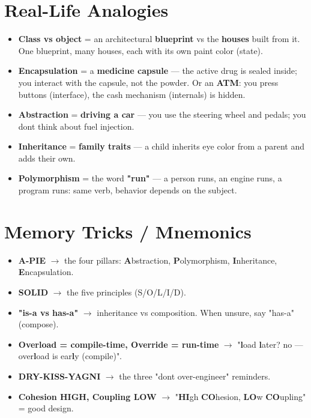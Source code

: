 \documentclass[11pt]{article}
\providecommand{\tightlist}{\setlength{\itemsep}{1pt}\setlength{\parskip}{0pt}}
\begin{document}
\section{Real-Life Analogies}\label{real-life-analogies}

\begin{itemize}
\tightlist
\item
  \textbf{Class vs object} = an architectural \textbf{blueprint} vs the \textbf{houses} built from it. One blueprint, many houses, each with its own paint color (state).
\item
  \textbf{Encapsulation} = a \textbf{medicine capsule} --- the active drug is sealed inside; you interact with the capsule, not the powder. Or an \textbf{ATM}: you press buttons (interface), the cash mechanism (internals) is hidden.
\item
  \textbf{Abstraction} = \textbf{driving a car} --- you use the steering wheel and pedals; you don\textquotesingle t think about fuel injection.
\item
  \textbf{Inheritance} = \textbf{family traits} --- a child inherits eye color from a parent and adds their own.
\item
  \textbf{Polymorphism} = the word \textbf{"run"} --- a person runs, an engine runs, a program runs: same verb, behavior depends on the subject.
\end{itemize}

\section{Memory Tricks / Mnemonics}\label{memory-tricks--mnemonics}

\begin{itemize}
\tightlist
\item
  \textbf{A-PIE} \(\rightarrow\) the four pillars: \textbf{A}bstraction, \textbf{P}olymorphism, \textbf{I}nheritance, \textbf{E}ncapsulation.
\item
  \textbf{SOLID} \(\rightarrow\) the five principles (S/O/L/I/D).
\item
  \textbf{"is-a vs has-a"} \(\rightarrow\) inheritance vs composition. When unsure, say "has-a" (compose).
\item
  \textbf{Overload = compile-time, Override = run-time} \(\rightarrow\) "\textbf{l}oad \textbf{l}ater? no --- over\textbf{l}oad is ear\textbf{l}y (compile)".
\item
  \textbf{DRY-KISS-YAGNI} \(\rightarrow\) the three "don\textquotesingle t over-engineer" reminders.
\item
  \textbf{Cohesion HIGH, Coupling LOW} \(\rightarrow\) "\textbf{HI}gh \textbf{CO}hesion, \textbf{LO}w \textbf{CO}upling" = good design.
\end{itemize}
\end{document}

